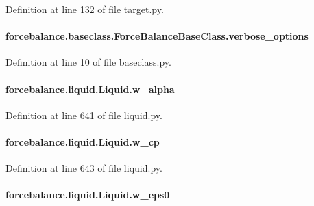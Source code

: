 Definition at line 132 of file target.\-py.

\hypertarget{classforcebalance_1_1baseclass_1_1ForceBalanceBaseClass_a8088e1e20cbd6bc175fb9c9fe9fa0f18}{
\paragraph[{verbose\-\_\-options}]{\setlength{\rightskip}{0pt plus 5cm}forcebalance.\-baseclass.\-Force\-Balance\-Base\-Class.\-verbose\-\_\-options\hspace{0.3cm}{\ttfamily [inherited]}}}\label{classforcebalance_1_1baseclass_1_1ForceBalanceBaseClass_a8088e1e20cbd6bc175fb9c9fe9fa0f18}


Definition at line 10 of file baseclass.\-py.

\hypertarget{classforcebalance_1_1liquid_1_1Liquid_a0d36d27d8c406b53bbb1096fbb76adbb}{
\paragraph[{w\-\_\-alpha}]{\setlength{\rightskip}{0pt plus 5cm}forcebalance.\-liquid.\-Liquid.\-w\-\_\-alpha}}\label{classforcebalance_1_1liquid_1_1Liquid_a0d36d27d8c406b53bbb1096fbb76adbb}


Definition at line 641 of file liquid.\-py.

\hypertarget{classforcebalance_1_1liquid_1_1Liquid_a3809c649d95ac6c9f662d599e6b1b93d}{
\paragraph[{w\-\_\-cp}]{\setlength{\rightskip}{0pt plus 5cm}forcebalance.\-liquid.\-Liquid.\-w\-\_\-cp}}\label{classforcebalance_1_1liquid_1_1Liquid_a3809c649d95ac6c9f662d599e6b1b93d}


Definition at line 643 of file liquid.\-py.

\hypertarget{classforcebalance_1_1liquid_1_1Liquid_a75ad3ea94ec845e91499f858e7be5f27}{
\paragraph[{w\-\_\-eps0}]{\setlength{\rightskip}{0pt plus 5cm}forcebalance.\-liquid.\-Liquid.\-w\-\_\-eps0}}\label{classforcebalance_1_1liquid_1_1Liquid_a75ad3ea94ec845e91499f858e7be5f27}



